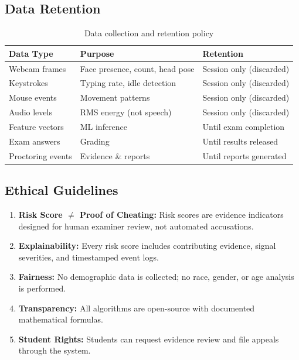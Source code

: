 \documentclass{article}
\begin{document}
\subsection{Data Retention}

\begin{table}[H]
\centering
\caption{Data collection and retention policy}
\label{tab:data_retention}
\begin{tabular}{l l l}
\toprule
\textbf{Data Type} & \textbf{Purpose} & \textbf{Retention} \\
\midrule
Webcam frames & Face presence, count, head pose & Session only (discarded) \\
Keystrokes & Typing rate, idle detection & Session only (discarded) \\
Mouse events & Movement patterns & Session only (discarded) \\
Audio levels & RMS energy (not speech) & Session only (discarded) \\
Feature vectors & ML inference & Until exam completion \\
Exam answers & Grading & Until results released \\
Proctoring events & Evidence \& reports & Until reports generated \\
\bottomrule
\end{tabular}
\end{table}

\subsection{Ethical Guidelines}

\begin{enumerate}
    \item \textbf{Risk Score $\neq$ Proof of Cheating:} Risk scores are evidence indicators designed for human examiner review, not automated accusations.
    \item \textbf{Explainability:} Every risk score includes contributing evidence, signal severities, and timestamped event logs.
    \item \textbf{Fairness:} No demographic data is collected; no race, gender, or age analysis is performed.
    \item \textbf{Transparency:} All algorithms are open-source with documented mathematical formulas.
    \item \textbf{Student Rights:} Students can request evidence review and file appeals through the system.
\end{enumerate}
\end{document}
